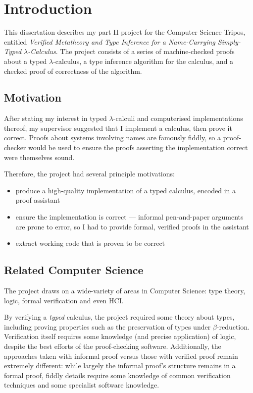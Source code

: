 \chapter{Introduction}
This dissertation describes my part II project for the Computer Science Tripos, entitled \emph{Verified Metatheory and Type Inference for a Name-Carrying Simply-Typed \(\lambda\)-Calculus}.
The project consists of a series of machine-checked proofs about a typed \(\lambda\)-calculus, a type inference algorithm for the calculus, and a checked proof of correctness of the algorithm.

\section{Motivation}
After stating my interest in typed \(\lambda\)-calculi and computerised implementations thereof, my supervisor suggested that I implement a calculus, then prove it correct.
Proofs about systems involving names are famously fiddly, so a proof-checker would be used to ensure the proofs asserting the implementation correct were themselves sound.

Therefore, the project had several principle motivations:
\begin{itemize}
\item
produce a high-quality implementation of a typed calculus, encoded in a proof assistant
\item
ensure the implementation is correct --- informal pen-and-paper arguments are prone to error, so I had to provide formal, verified proofs in the assistant
\item
extract working code that is proven to be correct
\end{itemize}
\section{Related Computer Science}
The project draws on a wide-variety of areas in Computer Science: type theory, logic, formal verification and even HCI.

By verifying a \emph{typed} calculus, the project required some theory about types, including proving properties such as the preservation of types under \(\beta\)-reduction.
Verification itself requires some knowledge (and precise application) of logic, despite the best efforts of the proof-checking software.
Additionally, the approaches taken with informal proof versus those with verified proof remain extremely different: while largely the informal proof's structure remains in a formal proof, fiddly details require some knowledge of common verification techniques and some specialist software knowledge.

